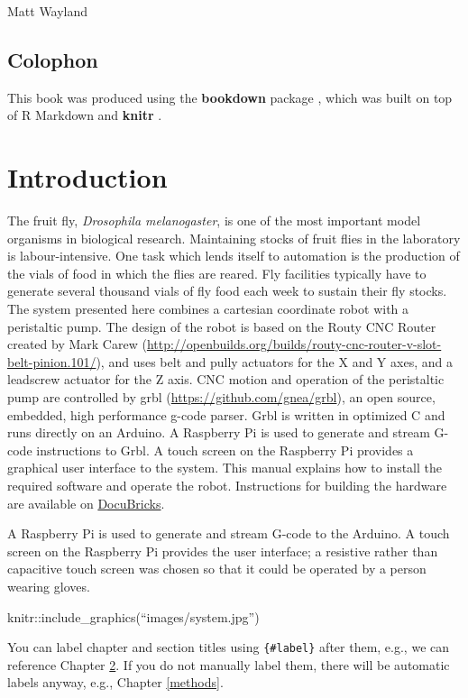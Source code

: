 \documentclass[]{book}
\theoremstyle{definition}
\theoremstyle{definition}
\theoremstyle{remark}
\begin{document}
Matt Wayland

\section{Colophon}\label{colophon}

This book was produced using the \textbf{bookdown} package
\citep{R-bookdown}, which was built on top of R Markdown and
\textbf{knitr} \citep{xie2015}.

\chapter{Introduction}\label{intro}

The fruit fly, \emph{Drosophila melanogaster}, is one of the most
important model organisms in biological research. Maintaining stocks of
fruit flies in the laboratory is labour-intensive. One task which lends
itself to automation is the production of the vials of food in which the
flies are reared. Fly facilities typically have to generate several
thousand vials of fly food each week to sustain their fly stocks. The
system presented here combines a cartesian coordinate robot with a
peristaltic pump. The design of the robot is based on the Routy CNC
Router created by Mark Carew
(\url{http://openbuilds.org/builds/routy-cnc-router-v-slot-belt-pinion.101/}),
and uses belt and pully actuators for the X and Y axes, and a leadscrew
actuator for the Z axis. CNC motion and operation of the peristaltic
pump are controlled by grbl (\url{https://github.com/gnea/grbl}), an
open source, embedded, high performance g-code parser. Grbl is written
in optimized C and runs directly on an Arduino. A Raspberry Pi is used
to generate and stream G-code instructions to Grbl. A touch screen on
the Raspberry Pi provides a graphical user interface to the system. This
manual explains how to install the required software and operate the
robot. Instructions for building the hardware are available on
\href{http://docubricks.com/viewer.jsp?id=8652757760093769728}{DocuBricks}.

A Raspberry Pi is used to generate and stream G-code to the Arduino. A
touch screen on the Raspberry Pi provides the user interface; a
resistive rather than capacitive touch screen was chosen so that it
could be operated by a person wearing gloves.

knitr::include\_graphics(``images/system.jpg'')

You can label chapter and section titles using \texttt{\{\#label\}}
after them, e.g., we can reference Chapter \ref{intro}. If you do not
manually label them, there will be automatic labels anyway, e.g.,
Chapter \ref{methods}.
\end{document}
